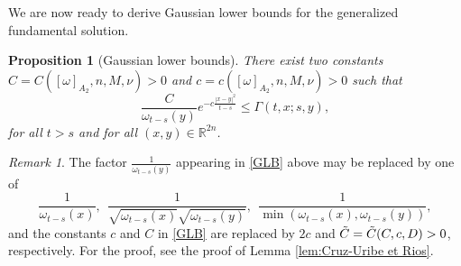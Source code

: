 \documentclass[12pt, letterpaper]{amsart}
\newtheorem{prop}[thm]{Proposition}
\theoremstyle{definition}
\theoremstyle{remark}
\newtheorem{rem}[thm]{Remark}
\numberwithin{equation}{section}
\begin{document}
We are now ready to derive Gaussian lower bounds for the generalized fundamental solution.
\begin{prop}[Gaussian lower bounds]\label{prop:GLB}
There exist two constants $C=C([ \omega  ]_{A_2},n,M,\nu)>0$ and $c=c([ \omega  ]_{A_2},n,M,\nu)>0$ such that 
\begin{equation}\label{GLB}
     \frac{C}{\omega_{t-s}(y)} e^{-c \frac{\left | x-y \right |^2}{t-s}} \leq \Gamma(t,x;s,y),
\end{equation}
for all $t>s$ and for all $(x,y) \in \mathbb{R}^{2n}$.
\end{prop}
\begin{rem}
    The factor $\frac{1}{\omega_{t-s}(y) }$ appearing in \eqref{GLB} above may be replaced by one of 
    \begin{equation*}
        \frac{1}{\omega_{t-s}(x) }, \ \ \frac{1}{\sqrt{\omega_{t-s}(x)}\sqrt{\omega_{t-s}(y)}}, \ \ \frac{1}{\min(\omega_{t-s}(x) ,\omega_{t-s}(y))},
    \end{equation*}
    and the constants $c$ and $C$ in \eqref{GLB} are replaced by $2c$ and $\Tilde{C}=\Tilde{C}(C,c,D)>0$, respectively. For the proof, see the proof of Lemma \ref{lem:Cruz-Uribe et Rios}.
\end{rem}
\end{document}
